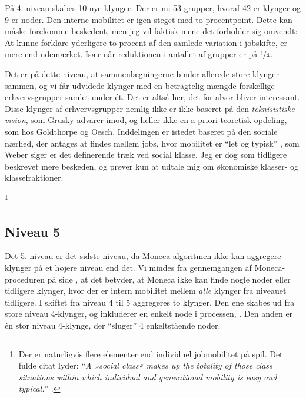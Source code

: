 På 4. niveau skabes 10 nye klynger. Der er nu 53 grupper, hvoraf 42 er klynger og 9 er noder. Den interne mobilitet er igen steget med to procentpoint. Dette kan måske forekomme beskedent, men jeg vil faktisk mene det forholder sig omvendt: At kunne forklare yderligere to procent af den samlede variation i jobskifte, er mere end udemærket. Især når reduktionen i antallet af grupper er på $\nicefrac{1}{4}$. 


Det er på dette niveau, at sammenlægningerne binder allerede store klynger sammen, og vi får udvidede klynger med en betragtelig mængde forskellige erhvervsgrupper samlet under ét. Det er altså her, det for alvor bliver interessant. 
Disse klynger af erhvervsgrupper nemlig ikke er ikke baseret på den \emph{teknisistiske vision}, som Grusky advarer imod, og heller ikke en a priori teoretisk opdeling, som hos Goldthorpe og Oesch. Inddelingen er istedet baseret på den sociale nærhed, der antages at findes mellem jobs, hvor mobilitet er “let og typisk” , som Weber siger er det definerende træk ved social klasse. Jeg er dog som tidligere beskrevet mere beskeden, og prøver kun at udtale mig om økonomiske klasser- og klassefraktioner.  %

%
\footnote{Der er naturligvis flere elementer end individuel jobmobilitet på spil. Det fulde citat lyder: “\textit{A »social class« makes up the totality of those class situations within which individual and generational mobility is easy and typical.}” \parencite[302]{Weber1978}. }%
%

\newpage \subsection{Niveau 5 \label{delanalyse1_endelige mobilitetskort}}

Det 5. niveau er det sidste niveau, da Moneca-algoritmen ikke kan aggregere klynger på et højere niveau end det. Vi mindes fra gennemgangen af Moneca-proceduren på side  \pageref{metode_monecastepbystep}, at det betyder, at Moneca ikke kan finde nogle noder eller tidligere klynger, hvor der er intern mobilitet mellem  \emph{alle} klynger fra niveauet tidligere. %
I skiftet fra niveau 4 til 5 aggregeres to klynger. Den ene skabes ud fra store niveau 4-klynger, og inkluderer en enkelt node i processen, . Den anden er én stor niveau 4-klynge, der “sluger” 4 enkeltstående noder. 

